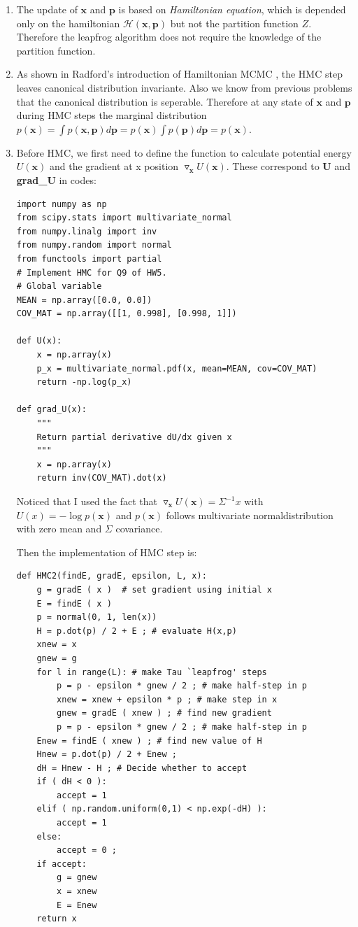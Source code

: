 \documentclass{article}
\begin{document}
\begin{enumerate}
\item 
The update of $\textbf{x}$ and $\textbf{p}$ is based on \textit{Hamiltonian equation}, which is depended only on the hamiltonian $\mathcal{H (\textbf{x},\textbf{p})}$ but not the partition function $Z$. Therefore the leapfrog algorithm does not require the knowledge of the partition function.
\pagebreak

\item 
As shown in Radford's introduction of Hamiltonian MCMC \cite{neal2011mcmc}, the HMC step leaves canonical distribution invariante.
Also we know from previous problems that the canonical distribution is seperable. Therefore at any state of $\textbf{x}$ and $\textbf{p}$ during HMC steps the marginal distribution $p(\textbf{x}) =\int p(\textbf{x}, \textbf{p}) d\textbf{p} = p(\textbf{x})\int p(\textbf{p})d\textbf{p} = p(\textbf{x})$.
\pagebreak

\item 
Before HMC, we first need to define the function to calculate potential energy $U(\textbf{x})$ and the gradient at x position $\triangledown_{\textbf{x}} U(\textbf{x})$. These correspond to \textbf{U} and \textbf{grad\_U} in codes:

\begin{verbatim}
import numpy as np
from scipy.stats import multivariate_normal
from numpy.linalg import inv
from numpy.random import normal
from functools import partial
# Implement HMC for Q9 of HW5.
# Global variable
MEAN = np.array([0.0, 0.0])
COV_MAT = np.array([[1, 0.998], [0.998, 1]])

def U(x):
    x = np.array(x)
    p_x = multivariate_normal.pdf(x, mean=MEAN, cov=COV_MAT)
    return -np.log(p_x)

def grad_U(x):
    """
    Return partial derivative dU/dx given x
    """
    x = np.array(x)
    return inv(COV_MAT).dot(x)
\end{verbatim}
Noticed that I used the fact that $\triangledown_{\textbf{x}} U(\textbf{x}) = \Sigma^{-1} x$ with $U(x) = -\log p(\textbf{x})$ and $p(\textbf{x})$ follows multivariate normaldistribution with zero mean and $\Sigma$ covariance.

Then the implementation of HMC step is:

\begin{verbatim}
def HMC2(findE, gradE, epsilon, L, x):
    g = gradE ( x )  # set gradient using initial x
    E = findE ( x )
    p = normal(0, 1, len(x))
    H = p.dot(p) / 2 + E ; # evaluate H(x,p)
    xnew = x 
    gnew = g 
    for l in range(L): # make Tau `leapfrog' steps
        p = p - epsilon * gnew / 2 ; # make half-step in p
        xnew = xnew + epsilon * p ; # make step in x
        gnew = gradE ( xnew ) ; # find new gradient
        p = p - epsilon * gnew / 2 ; # make half-step in p
    Enew = findE ( xnew ) ; # find new value of H
    Hnew = p.dot(p) / 2 + Enew ;
    dH = Hnew - H ; # Decide whether to accept
    if ( dH < 0 ):
        accept = 1 
    elif ( np.random.uniform(0,1) < np.exp(-dH) ):
        accept = 1
    else:
        accept = 0 ;
    if accept:
        g = gnew 
        x = xnew 
        E = Enew 
    return x
\end{verbatim}


\end{enumerate}
\end{document}
